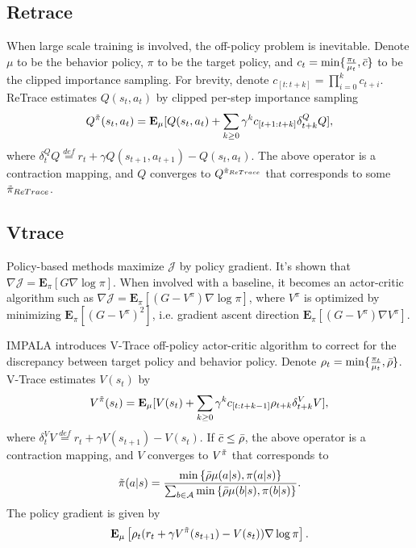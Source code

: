 \subsection{Retrace}

When large scale training is involved, the off-policy problem is inevitable.
Denote $\mu$ to be the behavior policy, $\pi$ to be the target policy, and $c_t = \min\{\frac{\pi_t}{\mu_t}, \Bar{c}\}$ to be the clipped importance sampling. 
For brevity, denote $c_{[t: t+k]} = \prod_{i=0}^{k} c_{t+i}$. 
ReTrace \citep{retrace} estimates $Q(s_t, a_t)$ by clipped per-step importance sampling
\begin{equation*}
\label{Equ: retrace}
    Q^{\Tilde{\pi}} (s_t, a_t) 
= \textbf{E}_{\mu} [ Q(s_t, a_t) + \sum_{k \geq 0} \gamma^k 
c_{[t+1:t+k]} \delta^{Q}_{t+k} Q ],
\end{equation*}
where $\delta^{Q}_t Q \overset{def}{=} r_t + \gamma Q(s_{t+1}, a_{t+1}) - Q(s_t, a_t)$. 
The above operator is a contraction mapping, 
and $Q$ converges to $Q^{\Tilde{\pi}_{ReTrace}}$ that corresponds to some $\Tilde{\pi}_{ReTrace}$.


\subsection{Vtrace}
Policy-based methods maximize $\mathcal{J}$ by policy gradient. 
It's shown \citep{sutton} that $\nabla \mathcal{J} = \textbf{E}_\pi [G \nabla \log \pi]$. 
When involved with a baseline, it becomes an actor-critic algorithm such as $\nabla \mathcal{J} = \textbf{E}_\pi [(G - V^\pi) \nabla \log \pi]$, where $V^\pi$ is optimized by minimizing $\textbf{E}_\pi [(G - V^\pi)^2]$, i.e. gradient ascent direction $\textbf{E}_\pi [(G - V^\pi)\nabla V^\pi]$.

IMPALA \citep{impala} introduces V-Trace off-policy actor-critic algorithm to correct for the discrepancy between target policy and behavior policy. Denote $\rho_t = \min\{\frac{\pi_t}{\mu_t}, \Bar{\rho} \}$. V-Trace estimates $V(s_t)$ by
\begin{equation*}
\label{Equ: vtrace}
    V^{\Tilde{\pi}} (s_t) 
        = \textbf{E}_{\mu} [ 
        V(s_t) + \sum_{k \geq 0} \gamma^k 
     c_{[t:t+k-1]} \rho_{t+k}  \delta^{V}_{t+k} V ],
\end{equation*}
where $\delta^{V}_t V \overset{def}{=} r_t + \gamma V(s_{t+1}) - V(s_t)$. 
If $\Bar{c} \leq \Bar{\rho}$, the above operator is a contraction mapping, and $V$ converges to $V^{\Tilde{\pi}}$ that corresponds to 
$$
        \Tilde{\pi}(a|s) = \frac
        {\min \left\{\Bar{\rho} \mu (a|s), \pi(a|s)\right\}}
        {\sum_{b \in \mathcal{A}}\min \left\{\Bar{\rho} \mu (b|s), \pi(b|s)\right\}}.
$$
The policy gradient is given by
$$
\textbf{E}_\mu \left[\rho_t (r_t + \gamma V^{\Tilde{\pi}}(s_{t+1}) - V(s_t)) \nabla \log \pi \right].
$$


